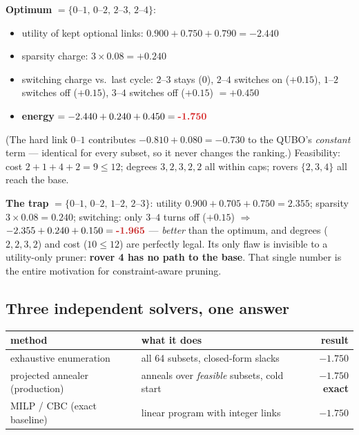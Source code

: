 \documentclass[11pt]{article}
\newenvironment{card}{%
  \def\FrameCommand{\fboxsep=8pt\fcolorbox{cardline}{cardbg}}%
  \MakeFramed{\advance\hsize-\width\FrameRestore}\noindent}{\endMakeFramed}
\newcommand{\good}[1]{\textcolor{goodg}{\textbf{#1}}}
\newcommand{\bad}[1]{\textcolor{badr}{\textbf{#1}}}
\newcommand{\key}[1]{\textcolor{quboc}{\textbf{#1}}}
\begin{document}
\begin{card}
\textbf{Optimum} $=\{0\text{--}1,\,0\text{--}2,\,2\text{--}3,\,2\text{--}4\}$:
\begin{itemize}
\item utility of kept optional links: $0.900 + 0.750 + 0.790 = -2.440$
\item sparsity charge: $3 \times 0.08 = +0.240$
\item switching charge vs.\ last cycle: $2\text{--}3$ stays (0),
$2\text{--}4$ switches on ($+0.15$), $1\text{--}2$ switches off ($+0.15$),
$3\text{--}4$ switches off ($+0.15$) $= +0.450$
\item \textbf{energy} $= -2.440 + 0.240 + 0.450 = \key{-1.750}$
\end{itemize}
(The hard link $0\text{--}1$ contributes $-0.810+0.080 = -0.730$ to the
QUBO's \emph{constant} term --- identical for every subset, so it never
changes the ranking.)
Feasibility: cost $2+1+4+2=9\le12$; degrees $3,2,3,2,2$ all within caps;
rovers $\{2,3,4\}$ all reach the base. \checkmark

\textbf{The trap} $=\{0\text{--}1,\,0\text{--}2,\,1\text{--}2,\,2\text{--}3\}$:
utility $0.900+0.705+0.750 = 2.355$; sparsity $3\times0.08=0.240$;
switching: only $3\text{--}4$ turns off ($+0.15$) $\Rightarrow$
$-2.355+0.240+0.150 = \bad{-1.965}$ --- \emph{better} than the optimum, and
degrees ($2,2,3,2$) and cost ($10\le12$) are perfectly legal. Its only flaw
is invisible to a utility-only pruner: \textbf{rover 4 has no path to the
base}. That single number is the entire motivation for constraint-aware
pruning.
\end{card}

\subsection{Three independent solvers, one answer}

\begin{center}
\begin{tabular}{llr}
\toprule
method & what it does & result \\
\midrule
exhaustive enumeration & all 64 subsets, closed-form slacks & \good{$-1.750$} \\
projected annealer (production) & anneals over \emph{feasible} subsets, cold start & \good{$-1.750$} \; \good{exact} \\
MILP / CBC (exact baseline) & linear program with integer links & \good{$-1.750$} \\
\bottomrule
\end{tabular}
\end{center}
\end{document}
